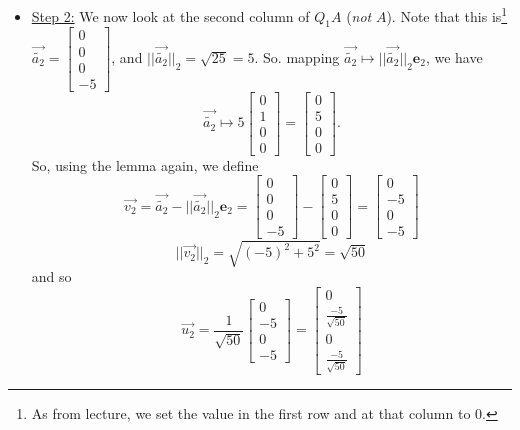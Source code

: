 \documentclass[letterpaper]{article}
\newcommand{\0}{\mathbf{0}}
\newcommand{\e}{\mathbf{e}}
\begin{document}
\begin{itemize}
    \item \underline{Step 2:} We now look at the second column of $Q_1 A$ (\emph{not} $A$). Note that this is\footnote{As from lecture, we set the value in the first row and at that column to 0.} $\vec{\tilde{a_2}} = \begin{bmatrix}
        0 \\ 0 \\ 0 \\ -5
    \end{bmatrix}$, and $||\vec{\tilde{a_2}}||_2 = \sqrt{25} = 5$. So. mapping $\vec{\tilde{a_2}} \mapsto ||\vec{\tilde{a_2}}||_2 \e_2$, we have 
    \[\vec{\tilde{a_2}} \mapsto 5 \begin{bmatrix}
        0 \\ 1 \\ 0 \\ 0
    \end{bmatrix} = \begin{bmatrix}
        0 \\ 5 \\ 0 \\ 0
    \end{bmatrix}.\] So, using the lemma again, we define 
    \[\vec{v_2} = \vec{\tilde{a_2}} - ||\vec{\tilde{a_2}}||_2 \e_2 = \begin{bmatrix}
        0 \\ 0 \\ 0 \\ -5
    \end{bmatrix} - \begin{bmatrix}
        0 \\ 5 \\ 0 \\ 0
    \end{bmatrix} = \begin{bmatrix}
        0 \\ -5 \\ 0 \\ -5
    \end{bmatrix}\] \[||\vec{v_2}||_2 = \sqrt{(-5)^2 + 5^2} = \sqrt{50}\] and so \[\vec{u_2} = \frac{1}{\sqrt{50}} \begin{bmatrix}
        0 \\ -5 \\ 0 \\ -5
    \end{bmatrix} = \begin{bmatrix}
        0 \\ \frac{-5}{\sqrt{50}} \\ 0 \\ \frac{-5}{\sqrt{50}}

\end{bmatrix}\]
\end{itemize}
\end{document}

